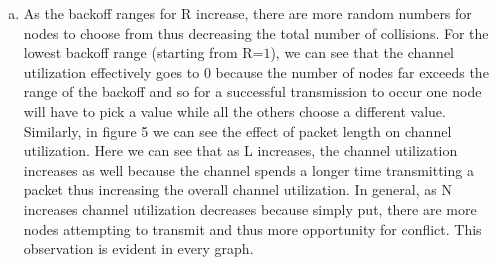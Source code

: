 \documentclass[11pt]{article}
\begin{document}
\begin{enumerate}[a.]
\vspace*{2mm}
\item As the backoff ranges for R increase, there are more random numbers for nodes to choose from thus decreasing the total number of collisions. For the lowest backoff range (starting from R=$1$), we can see that the channel utilization effectively goes to $0$ because the number of nodes far exceeds the range of the backoff and so for a successful transmission to occur one node will have to pick a value while all the others choose a different value. Similarly, in figure 5 we can see the effect of packet length on channel utilization. Here we can see that as L increases, the channel utilization increases as well because the channel spends a longer time transmitting a packet thus increasing the overall channel utilization. In general, as N increases channel utilization decreases because simply put, there are more nodes attempting to transmit and thus more opportunity for conflict. This observation is evident in every graph.


\end{enumerate}
\end{document}
